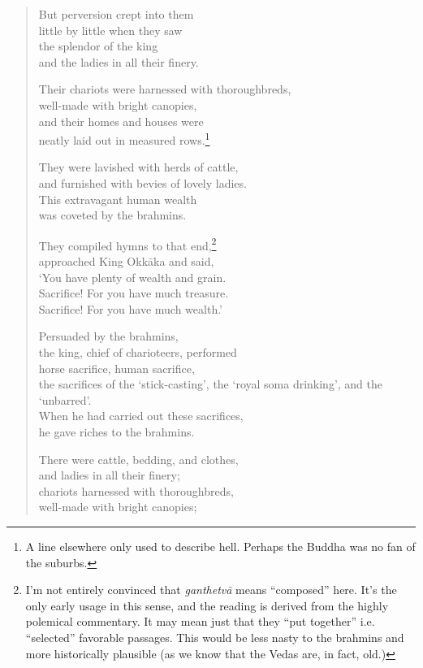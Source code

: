 \documentclass[12pt,openany]{book}%
\begin{document}
\begin{verse}
But perversion crept into them \\
little by little when they saw \\
the splendor of the king \\
and the ladies in all their finery. 

Their chariots were harnessed with thoroughbreds, \\
well-made with bright canopies, \\
and their homes and houses were \\
neatly laid out in measured rows.\footnote{A line elsewhere only used to describe hell. Perhaps the Buddha was no fan of the suburbs. } 

They were lavished with herds of cattle, \\
and furnished with bevies of lovely ladies. \\
This extravagant human wealth \\
was coveted by the brahmins. 

They compiled hymns to that end,\footnote{I’m not entirely convinced that \textit{\textsanskrit{ganthetvā}} means “composed” here. It’s the only early usage in this sense, and the reading is derived from the highly polemical commentary. It may mean just that they “put together” i.e. “selected” favorable passages. This would be less nasty to the brahmins and more historically plausible (as we know that the Vedas are, in fact, old.) } \\
approached King \textsanskrit{Okkāka} and said, \\
‘You have plenty of wealth and grain. \\
Sacrifice! For you have much treasure. \\
Sacrifice! For you have much wealth.’ 

Persuaded by the brahmins, \\
the king, chief of charioteers, performed \\
horse sacrifice, human sacrifice, \\
the sacrifices of the ‘stick-casting’, the ‘royal soma drinking’, and the ‘unbarred’. \\
When he had carried out these sacrifices, \\
he gave riches to the brahmins. 

There were cattle, bedding, and clothes, \\
and ladies in all their finery; \\
chariots harnessed with thoroughbreds, \\
well-made with bright canopies; 


\end{verse}
\end{document}
